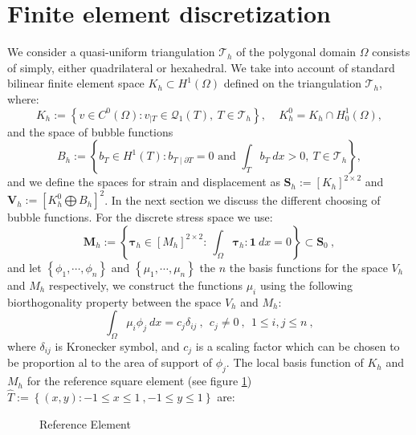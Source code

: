 \documentclass[a4paper,11pt]{article}
\begin{document}
\section{Finite element discretization}
We consider a quasi-uniform triangulation $\mathcal{T}_{h}$ of the polygonal domain $\Omega$ consists of simply, either quadrilateral or hexahedral.
We take into account of standard bilinear finite element space $K_{h}\subset H^{1}(\Omega)$ defined on the triangulation $\mathcal{T}_{h}$, where:
\begin{equation}
K_{h} := \left\lbrace v \in C^{0}(\Omega): v_{\mid T}\in \mathcal{Q}_{1}(T), \: T\in \mathcal{T}_{h} \right\rbrace ,
\:\:\:\:\: K_{h}^{0} = K_{h} \cap H_{0}^{1}(\Omega) ,
\end{equation} 
and the space of bubble functions
\begin{equation}
B_{h} := \left\lbrace b_{T}\in H^{1}(T): b_{T\mid \partial T}=0 
\mbox{ and } \int_{T} b_{T} \: dx > 0, \: T\in \mathcal{T}_{h} 
\right\rbrace ,
\end{equation}
and we define the spaces for strain and displacement as $\bm{S}_{h}:=[K_{h}]^{2\times 2}$ and $\bm{V}_{h}:=\left[K_{h}^{0} \bigoplus B_{h}\right]^{2}$. 
In the next section we discuss the different choosing of bubble functions.
For the discrete stress space we use:
\begin{equation}
\bm{M}_{h}:=\left\lbrace \bm{\tau}_{h}\in \left[M_{h}\right]^{2\times 2}: \: \int_{\Omega} \bm{\tau}_{h} : \bm{1} \: dx = 0 \right\rbrace \subset \bm{S}_{0}\:,
\end{equation}
and let $\left\lbrace \phi_{1}, \cdots, \phi_{n}\right\rbrace$ and 
$\left\lbrace \mu_{1}, \cdots, \mu_{n}\right\rbrace$ the $n$ the basis functions for the space $V_{h}$ and $M_{h}$ respectively, we construct the functions $\mu_{i}$ using the following biorthogonality property between the space $V_{h}$ and $M_{h}$:
\begin{equation}
\int_{\Omega}\mu_{i}\phi_{j} \: dx = c_{j}\delta_{ij}\:, \:\: c_{j}\neq 0\:,
\:\: 1 \leq i,j \leq n \:,
\end{equation}
where $\delta_{ij}$ is Kronecker symbol, and $c_{j}$ is a scaling factor which can be chosen to be proportion al to the area of support of $\phi_{j}$.
The local basis function of $K_{h}$ and $M_{h}$ for the reference square element (see figure \ref{fig:ref_element}) $\hat{T}:=\left\lbrace (x,y): -1\leq x \leq 1 \:, -1\leq y \leq 1 \right\rbrace$ are:
\begin{figure}[h!]
\begin{center}

\caption{Reference Element \label{fig:ref_element}}
\end{center}
\end{figure}
\end{document}
